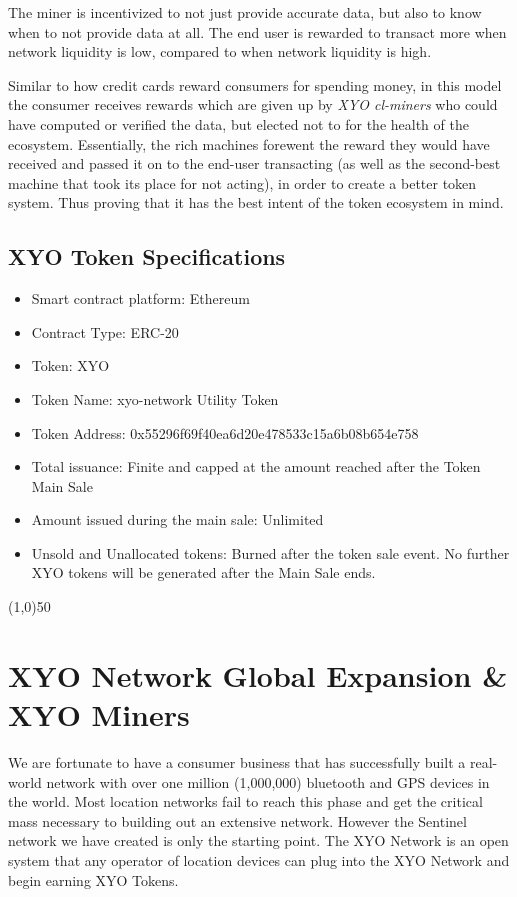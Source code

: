 \documentclass{article}
\begin{document}
The miner is incentivized to not just provide accurate data, but also to know when to not provide data at all. The end user is rewarded to transact more when network liquidity is low, compared to when network liquidity is high.

Similar to how credit cards reward consumers for spending money, in this model the consumer receives rewards which are given up by \textit{XYO cl-miners} who could have computed or verified the data, but elected not to for the health of the ecosystem. Essentially, the rich machines forewent the reward they would have received and passed it on to the end-user transacting (as well as the second-best machine that took its place for not acting), in order to create a better token system. Thus proving that it has the best intent of the token ecosystem in mind.

\subsection {XYO Token Specifications}
\begin{itemize}
\item Smart contract platform: Ethereum
\item Contract Type: ERC-20
\item Token: XYO
\item Token Name: \Gls{xyo-network} Utility Token
\item Token Address: 0x55296f69f40ea6d20e478533c15a6b08b654e758
\item Total issuance: Finite and capped at the amount reached after the Token Main Sale
\item Amount issued during the main sale: Unlimited
\item Unsold and Unallocated tokens: Burned after the token sale event. No further XYO tokens will be generated after the Main Sale ends.
\end{itemize}

\begin{center}
\line(1,0){50}
\end{center}

\section {XYO Network Global Expansion \& XYO Miners}
We are fortunate to have a consumer business that has successfully built a real-world network with over one million (1,000,000) bluetooth and GPS devices in the world. Most location networks fail to reach this phase and get the critical mass necessary to building out an extensive network. However the Sentinel network we have created is only the starting point. The XYO Network is an open system that any operator of location devices can plug into the XYO Network and begin earning XYO Tokens. 
\end{document}
